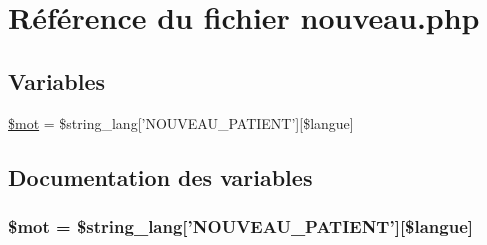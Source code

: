 \hypertarget{nouveau_8php}{
\section{R\'{e}f\'{e}rence du fichier nouveau.php}
\label{nouveau_8php}
}
\subsection*{Variables}
\begin{CompactItemize}
\item 
\hyperlink{nouveau_8php_a0}{\$mot} = \$string\_\-lang\mbox{[}'NOUVEAU\_\-PATIENT'\mbox{]}\mbox{[}\$langue\mbox{]}
\end{CompactItemize}


\subsection{Documentation des variables}
\hypertarget{nouveau_8php_a0}{
\subsubsection[\$mot]{\setlength{\rightskip}{0pt plus 5cm}\$mot = \$string\_\-lang\mbox{[}'NOUVEAU\_\-PATIENT'\mbox{]}\mbox{[}\$langue\mbox{]}}}
\label{nouveau_8php_a0}



